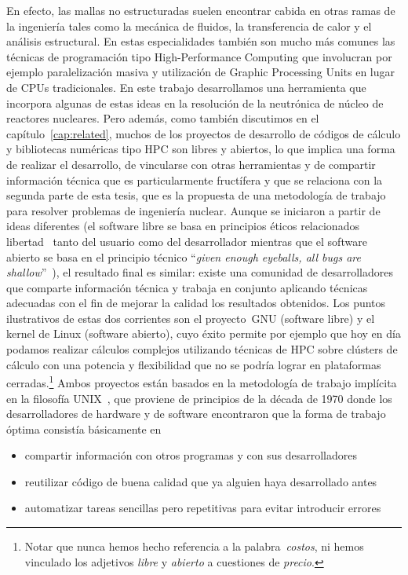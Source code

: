 En efecto, las mallas no estructuradas suelen encontrar cabida en otras ramas de la ingeniería tales como la mecánica de fluidos, la transferencia de calor y el análisis estructural. En estas especialidades también son mucho más comunes las técnicas de programación tipo High-Performance Computing que involucran por ejemplo paralelización masiva y utilización de Graphic Processing Units en lugar de CPUs tradicionales. En este trabajo desarrollamos una herramienta que incorpora algunas de estas ideas en la resolución de la  neutrónica de núcleo de reactores nucleares. Pero además, como también discutimos en el capítulo~\ref{cap:related}, muchos de los proyectos de desarrollo de códigos de cálculo y bibliotecas numéricas tipo HPC son libres y abiertos, lo que implica una forma de realizar el desarrollo, de vincularse con otras herramientas y de compartir información técnica que es particularmente fructífera y que se relaciona con la segunda parte de esta tesis, que es la propuesta de una metodología de trabajo para resolver problemas de ingeniería nuclear. Aunque se iniciaron a partir de ideas diferentes (el software libre se basa en principios éticos relacionados libertad~\cite{faif} tanto del usuario como del desarrollador mientras que  el software abierto se basa en el principio técnico ``\emph{given enough eyeballs, all bugs are shallow}''~\cite{cathedral}), el resultado final es similar: existe una comunidad de desarrolladores que comparte información técnica y trabaja en conjunto aplicando técnicas adecuadas con el fin de mejorar la calidad los resultados obtenidos. Los puntos ilustrativos de estas dos corrientes son el proyecto~GNU (software libre) y el kernel de Linux (software abierto), cuyo éxito permite por ejemplo que hoy en día podamos realizar cálculos complejos utilizando técnicas de HPC sobre clústers de cálculo con una potencia y flexibilidad que no se podría lograr en plataformas cerradas.\footnote{Notar que nunca hemos hecho referencia a la palabra~\emph{costos}, ni hemos vinculado los adjetivos \emph{libre} y \emph{abierto} a cuestiones de \emph{precio}.} Ambos proyectos están basados en la metodología de trabajo implícita en la filosofía UNIX~\cite{raymond}, que proviene de principios de la década de 1970 donde los desarrolladores de hardware y de software encontraron que la forma de trabajo óptima consistía básicamente en

\begin{itemize}
 \item compartir información con otros programas y con sus desarrolladores
 \item reutilizar código de buena calidad que ya alguien haya desarrollado antes
 \item automatizar tareas sencillas pero repetitivas para evitar introducir errores
\end{itemize}

